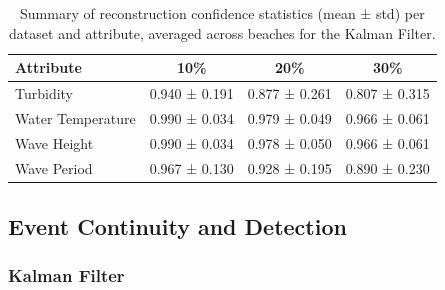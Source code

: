 \begin{table}[H]
\centering
\caption{Summary of reconstruction confidence statistics (mean ± std) per dataset and attribute, averaged across beaches for the Kalman Filter.}
\label{tab:confidence_stats_per_dataset_attribute}
\begin{tabular}{lccc}
\toprule
\textbf{Attribute} & \textbf{10\%} & \textbf{20\%} & \textbf{30\%} \\
\midrule
Turbidity         & 0.940 ± 0.191 & 0.877 ± 0.261 & 0.807 ± 0.315 \\
Water Temperature & 0.990 ± 0.034 & 0.979 ± 0.049 & 0.966 ± 0.061 \\
Wave Height       & 0.990 ± 0.034 & 0.978 ± 0.050 & 0.966 ± 0.061 \\
Wave Period       & 0.967 ± 0.130 & 0.928 ± 0.195 & 0.890 ± 0.230 \\
\bottomrule
\end{tabular}
\end{table}


\subsection{Event Continuity and Detection}
\subsubsection{Kalman Filter}
